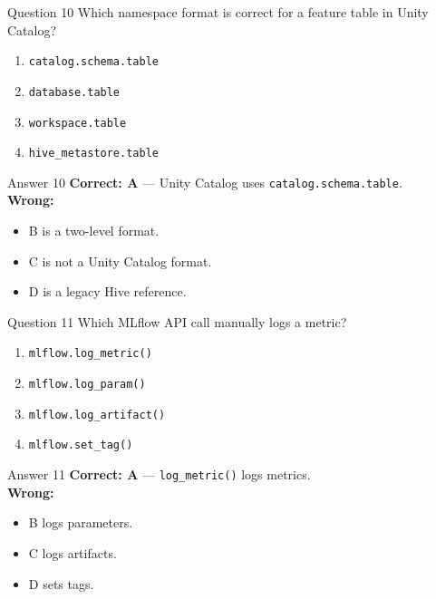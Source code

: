 \documentclass[aspectratio=169,11pt]{beamer}
\begin{document}
	\begin{frame}{Question 10}
		Which namespace format is correct for a feature table in Unity Catalog?
		\begin{enumerate}[label=\Alph*.]
			\item \texttt{catalog.schema.table}
			\item \texttt{database.table}
			\item \texttt{workspace.table}
			\item \texttt{hive\_metastore.table}
		\end{enumerate}
	\end{frame}
	\begin{frame}{Answer 10}
		\textbf{Correct: A} --- Unity Catalog uses \texttt{catalog.schema.table}.\\
		\vspace{0.5em}
		\textbf{Wrong:}
		\begin{itemize}
			\item B is a two-level format.
			\item C is not a Unity Catalog format.
			\item D is a legacy Hive reference.
		\end{itemize}
	\end{frame}
	
	\begin{frame}{Question 11}
		Which MLflow API call manually logs a metric?
		\begin{enumerate}[label=\Alph*.]
			\item \texttt{mlflow.log\_metric()}
			\item \texttt{mlflow.log\_param()}
			\item \texttt{mlflow.log\_artifact()}
			\item \texttt{mlflow.set\_tag()}
		\end{enumerate}
	\end{frame}
	\begin{frame}{Answer 11}
		\textbf{Correct: A} --- \texttt{log\_metric()} logs metrics.\\
		\vspace{0.5em}
		\textbf{Wrong:}
		\begin{itemize}
			\item B logs parameters.
			\item C logs artifacts.
			\item D sets tags.
		\end{itemize}
	\end{frame}
	
\end{document}
